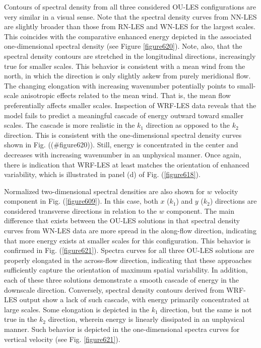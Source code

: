 Contours of spectral density from all three considered OU-LES configurations are very similar in a visual sense. Note that the spectral density curves from NN-LES are slightly broader than those from RN-LES and WN-LES for the largest scales. This coincides with the comparative enhanced energy depicted in the associated one-dimensional spectral density (see Figure \autoref{figure620}). Note, also, that the spectral density contours are stretched in the longitudinal directions, increasingly true for smaller scales. This behavior is consistent with a mean wind from the north, in which the direction is only slightly askew from purely meridional flow. The changing elongation with increasing wavenumber potentially points to small-scale anisotropic effects related to the mean wind. That is, the mean flow preferentially affects smaller scales. Inspection of WRF-LES data reveals that the model fails to predict a meaningful cascade of energy outward toward smaller scales. The cascade is more realistic in the $k_1$ direction as opposed to the $k_2$ direction. This is consistent with the one-dimensional spectral density curves shown in Fig. ((\#figure620)). Still, energy is concentrated in the center and decreases with increasing wavenumber in an unphysical manner. Once again, there is indication that WRF-LES at least matches the orientation of enhanced variability, which is illustrated in panel (d) of Fig. (\autoref{figure618}).

Normalized two-dimensional spectral densities are also shown for $w$ velocity component in Fig. (\autoref{figure609}). In this case, both $x$ ($k_1$) and $y$ ($k_2$) directions are considered transverse directions in relation to the $w$ component. The main difference that exists between the OU-LES solutions in that spectral density curves from WN-LES data are more spread in the along-flow direction, indicating that more energy exists at smaller scales for this configuration. This behavior is confirmed in Fig. (\autoref{figure621}). Spectra curves for all three OU-LES solutions are properly elongated in the across-flow direction, indicating that these approaches sufficiently capture the orientation of maximum spatial variability. In addition, each of these three solutions demonstrate a smooth cascade of energy in the downscale direction. Conversely, spectral density contours derived from WRF-LES output show a lack of such cascade, with energy primarily concentrated at large scales. Some elongation is depicted in the $k_1$ direction, but the same is not true in the $k_2$ direction, wherein energy is linearly dissipated in an unphysical manner. Such behavior is depicted in the one-dimensional spectra curves for vertical velocity (see Fig. \autoref{figure621}). 


